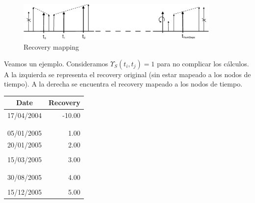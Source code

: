 \begin{figure}[!hb]
\begin{center}
\includegraphics[width=10cm,angle=0]{./images/nettingmapping.eps}
\caption{Recovery mapping}
\label{timetranches}
\end{center}
\end{figure}

Veamos un ejemplo. Consideramos $\Upsilon_S(t_i,t_j)=1$ para no complicar los c\'alculos.
A la izquierda se representa el recovery original (sin estar mapeado a los nodos de
tiempo). A la derecha se encuentra el recovery mapeado a los nodos de tiempo.
\newline
\newline
\begin{minipage}[c]{0.4\columnwidth}%
\centering
\begin{tabular}{c|r}
\textbf{Date} & \textbf{Recovery} \\
\hline
17/04/2004 & -10.00 \\
           &        \\
           &        \\
05/01/2005 &   1.00 \\
20/01/2005 &   2.00 \\
           &        \\
15/03/2005 &   3.00 \\
           &        \\
           &        \\
30/08/2005 &   4.00 \\
           &        \\
15/12/2005 &   5.00 \\
\end{tabular}
\end{minipage}%
